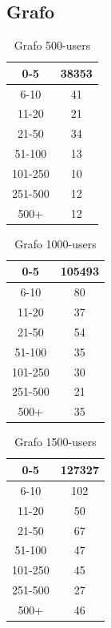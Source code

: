     \subsection{Grafo}
    \begin{table}[h!]
    \begin{tabular}{ |c|c| }
     \hline
     0-5 & 38353 \\
     \hline
     6-10 & 41 \\
     \hline
     11-20 & 21 \\
     \hline
     21-50 & 34 \\
     \hline
     51-100 & 13 \\
     \hline
     101-250 & 10 \\
     \hline
     251-500 & 12 \\
     \hline
     500+ & 12 \\
     \hline
    \end{tabular}
    \caption{Grafo 500-users}
    \end{table}
    \begin{table}[h!]
    \begin{tabular}{ |c|c| }
     \hline
     0-5 & 105493 \\
     \hline
     6-10 & 80 \\
     \hline
     11-20 & 37 \\
     \hline
     21-50 & 54 \\
     \hline
     51-100 & 35 \\
     \hline
     101-250 & 30 \\
     \hline
     251-500 & 21 \\
     \hline
     500+ & 35 \\
     \hline
    \end{tabular}
    \caption{Grafo 1000-users}
    \end{table}
    \begin{table}[h!]
    \begin{tabular}{ |c|c| }
     \hline
     0-5 & 127327 \\
     \hline
     6-10 & 102 \\
     \hline
     11-20 & 50 \\
     \hline
     21-50 & 67 \\
     \hline
     51-100 & 47 \\
     \hline
     101-250 & 45 \\
     \hline
     251-500 & 27 \\
     \hline
     500+ & 46 \\
     \hline
    \end{tabular}
    \caption{Grafo 1500-users}
    \end{table}
